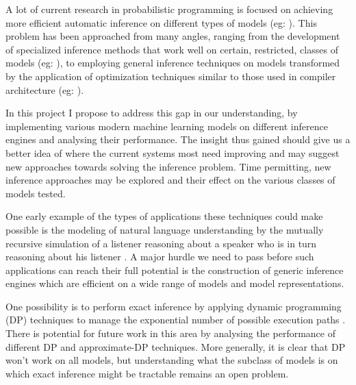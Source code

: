 A lot of current research in probabilistic programming is focused on achieving more efficient automatic inference on different types of models (eg: \cite{goodman2013principles, wingate2011nonstandard, wood2014new}). This problem has been approached from many angles, ranging from the development of specialized inference methods that work well on certain, restricted, classes of models (eg: \cite{stuhlmuller2012dynamic, yeh2012synthesizing}), to employing general inference techniques on models transformed by the application of optimization techniques similar to those used in compiler architecture (eg: \cite{mansinghka2014venture, yang2013incrementalizing}).

In this project I propose to address this gap in our understanding, by implementing various modern machine learning models on different inference engines and analysing their performance. The insight thus gained should give us a better idea of where the current systems most need improving and may suggest new approaches towards solving the inference problem. Time permitting, new inference approaches may be explored and their effect on the various classes of models tested.


One early example of the types of applications these techniques could make possible is the modeling of natural language understanding by the mutually recursive simulation of a listener reasoning about a speaker who is in turn reasoning about his listener \cite{goodman2013knowledge, frank2012predicting}. A major hurdle we need to pass before such applications can reach their full potential is the construction of generic inference engines which are efficient on a wide range of models and model representations. 

One possibility is to perform exact inference by applying dynamic programming (DP) techniques to manage the exponential number of possible execution paths \cite{stuhlmuller2012dynamic}. There is potential for future work in this area by analysing the performance of different DP and approximate-DP techniques. More generally, it is clear that DP won’t work on all models, but understanding what the subclass
of models is on which exact inference might be tractable remains an open problem. 

